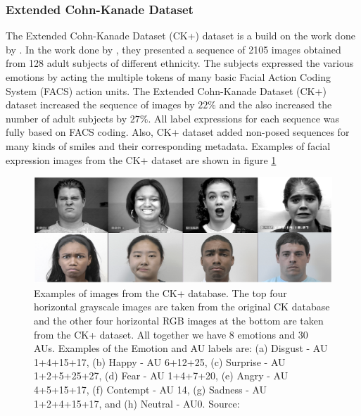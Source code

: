 \documentclass[master]{thesis-uestc}
\begin{document}
\subsubsection{Extended Cohn-Kanade Dataset}
The Extended Cohn-Kanade Dataset (CK+) dataset\cite{5543262} is a build on the work done by \cite{ck_840611}. In the work done by \cite{ck_840611}, they presented a sequence of 2105 images obtained from 128 adult subjects of different ethnicity. The subjects expressed the various emotions by acting the multiple tokens of many basic Facial Action Coding System (FACS)\cite{ekman_facs} action units. The Extended Cohn-Kanade Dataset (CK+) dataset increased the sequence of images by $22\%$ and the also increased the number of adult subjects by $27\%$. All label expressions for each sequence was fully based on FACS coding. Also, CK+ dataset added non-posed sequences for many kinds of smiles and their corresponding metadata. Examples of facial expression images from the CK+ dataset are shown in figure \ref{CK+_images}
\begin{figure}[ht]
\includegraphics[width=5in]{pic/ck+.PNG}
\caption{Examples of images from the CK+ database. The top four horizontal grayscale images are taken from the original CK database and the other four horizontal RGB images at the bottom are taken from the CK+ dataset. All together we have 8 emotions and 30 AUs. Examples of the Emotion and AU labels
are: (a) Disgust - AU 1+4+15+17, (b) Happy - AU 6+12+25, (c) Surprise - AU 1+2+5+25+27, (d) Fear - AU 1+4+7+20, (e) Angry - AU 4+5+15+17, (f) Contempt - AU 14, (g) Sadness - AU 1+2+4+15+17, and (h) Neutral - AU0. Source: \cite{5543262}}
\label{CK+_images}
\end{figure}
\end{document}
